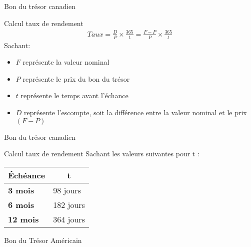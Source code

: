 \documentclass{beamer}
\begin{document}
\begin{frame}{Bon du trésor canadien}
\begin{block}{Calcul taux de rendement}
\begin{align*}
Taux = \frac{D}{P} \times \frac{365}{t}=\frac{F-P}{P} \times \frac{365}{t}
\end{align*}
Sachant:
\begin{itemize}
\item $F$ représente la valeur nominal 
\item $P$ représente le prix du bon du trésor 
\item $t$ représente le temps avant l'échance 
\item $D$ représente l'escompte, soit la différence entre la valeur nominal et le prix $(F-P)$
\end{itemize}
\end{block}
\end{frame}

\begin{frame}{Bon du trésor canadien}
\begin{block}{Calcul taux de rendement}
Sachant les valeurs suivantes pour t :
\begin{table}[H]
\centering
\begin{tabular}{@{}ll@{}}
\toprule
\textbf{Échéance} & \multicolumn{1}{c}{\textbf{t}} \\ \midrule
\textbf{3 mois}   & 98 jours                       \\
\textbf{6 mois}   & 182 jours                      \\
\textbf{12 mois}  & 364 jours                      \\ \bottomrule
\end{tabular}
\end{table}
\end{block}
\end{frame}



\begin{frame}{Bon du Trésor Américain}
\end{frame}
\end{document}
